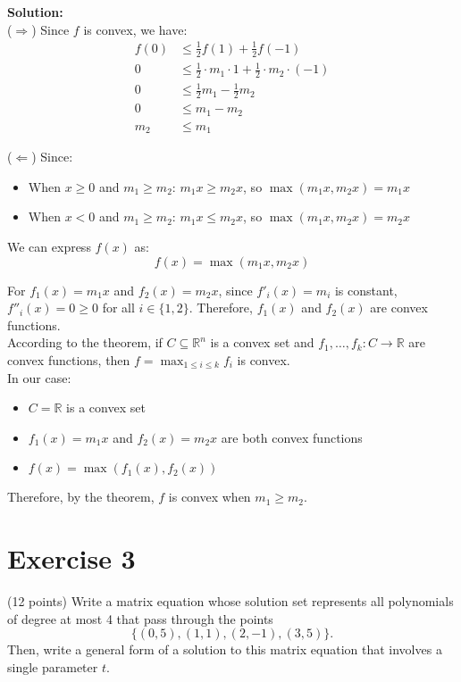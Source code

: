 \documentclass{article}
\begin{document}
\textbf{Solution:} \\

($\Rightarrow$) Since $f$ is convex, we have:
\begin{align*}
f(0) &\leq \frac{1}{2}f(1) + \frac{1}{2}f(-1)\\
0 &\leq \frac{1}{2} \cdot m_1 \cdot 1 + \frac{1}{2} \cdot m_2 \cdot (-1)\\
0 &\leq \frac{1}{2}m_1 - \frac{1}{2}m_2\\
0 &\leq m_1 - m_2\\
m_2 &\leq m_1
\end{align*}

($\Leftarrow$) Since:
\begin{itemize}
    \item When $x \geq 0$ and $m_1 \geq m_2$: $m_1x \geq m_2x$, so $\max(m_1x, m_2x) = m_1x$
    \item When $x < 0$ and $m_1 \geq m_2$: $m_1x \leq m_2x$, so $\max(m_1x, m_2x) = m_2x$
\end{itemize}

We can express $f(x)$ as:
$$f(x) = \max(m_1x, m_2x)$$

For $f_1(x) = m_1x$ and $f_2(x) = m_2x$, since $f'_{i}(x) = m_i$ is constant, $f''_i(x) = 0 \geq 0$ for all $i \in \{1, 2\}$. Therefore, $f_1(x)$ and $f_2(x)$ are convex functions. \\

According to the theorem, if $C \subseteq \mathbb{R}^n$ is a convex set and $f_1, \ldots, f_k : C \to \mathbb{R}$ are convex functions, then $f = \max_{1 \leq i \leq k} f_i$ is convex. \\

In our case:
\begin{itemize}
    \item $C = \mathbb{R}$ is a convex set
    \item $f_1(x) = m_1x$ and $f_2(x) = m_2x$ are both convex functions
    \item $f(x) = \max(f_1(x), f_2(x))$
\end{itemize}
Therefore, by the theorem, $f$ is convex when $m_1 \geq m_2$.

\newpage

\section*{Exercise 3}
(12 points) Write a matrix equation whose solution set represents all polynomials of degree at most 4 that pass through the points
\[
\{(0,5), (1,1), (2,-1), (3,5)\}.
\]
Then, write a general form of a solution to this matrix equation that involves a single parameter $t$. \\
\end{document}

